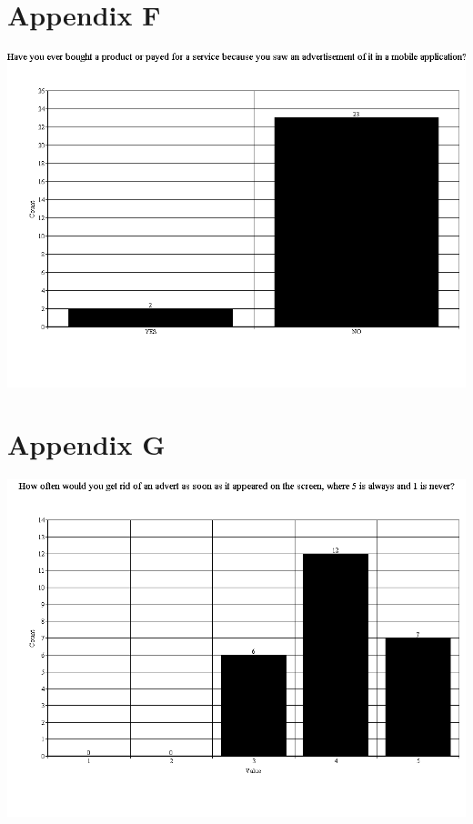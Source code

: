 \section{Appendix F}
\includegraphics[scale=0.5]{Images/q6}
\section{Appendix G}
\includegraphics[scale=0.5]{Images/q7}
